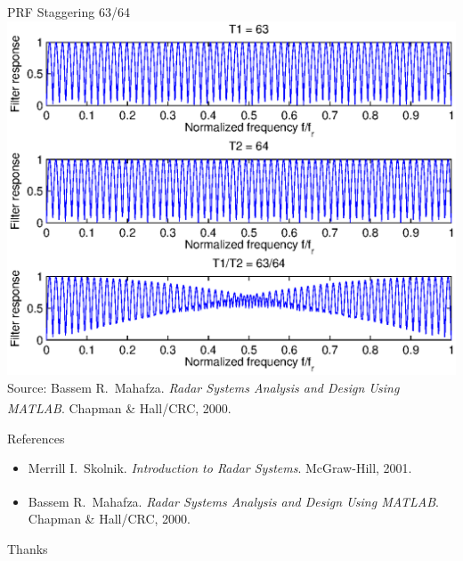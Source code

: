 \documentclass[mathserif]{beamer}
\begin{document}
   
    \begin{frame}{PRF Staggering 63/64}
    \includegraphics[width=\linewidth]{prfStaggering63_64} \\
      \tiny{Source: Bassem R.~Mahafza. \emph{Radar Systems Analysis and Design Using MATLAB\textsuperscript{\textregistered}}. Chapman \& Hall/CRC, 2000.}
    \end{frame}
    

    \begin{frame}{References}
        
        \begin{itemize}
                 \item Merrill I.~Skolnik. \emph{Introduction to Radar Systems}. McGraw-Hill, 2001.
                 \item Bassem R.~Mahafza. \emph{Radar Systems Analysis and Design Using MATLAB\textsuperscript{\textregistered}}. Chapman \& Hall/CRC, 2000.
                 
        \end{itemize}
    \end{frame}
    
    
    \begin{frame}[c]
     \begin{center}
       \Huge Thanks
     \end{center}
    \end{frame}

    
\end{document}
